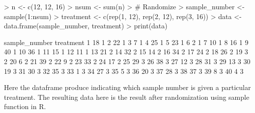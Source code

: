 \documentclass{article}
\begin{document}
\begin{Schunk}
\begin{Sinput}
> n <- c(12, 12, 16)
> nsum <- sum(n)
> # Randomize
> sample_number <- sample(1:nsum)
> treatment <- c(rep(1, 12), rep(2, 12), rep(3, 16))
> data <- data.frame(sample_number, treatment)
> print(data)
\end{Sinput}
\begin{Soutput}
   sample_number treatment
1             18         1
2             22         1
3              7         1
4             25         1
5             23         1
6              2         1
7             10         1
8             16         1
9             40         1
10            36         1
11            15         1
12            11         1
13            21         2
14            32         2
15            14         2
16            34         2
17            24         2
18            26         2
19             3         2
20             6         2
21            39         2
22             9         2
23            33         2
24            17         2
25            29         3
26            38         3
27            12         3
28            31         3
29            13         3
30            19         3
31            30         3
32            35         3
33             1         3
34            27         3
35             5         3
36            20         3
37            28         3
38            37         3
39             8         3
40             4         3
\end{Soutput}
\end{Schunk}

\noindent Here the dataframe produce indicating which sample number is given a particular treatment. The resulting data here is the result after randomization using sample function in R.
\end{document}
